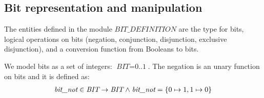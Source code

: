 \documentclass[a4paper]{llncs}
\begin{document}
\subsection{Bit representation and manipulation}
\label{subsec:HardwareLibrary1}

The entities defined in the module $\textit{BIT\_DEFINITION}$ are the
type for bits, logical operations on bits (negation, conjunction,
disjunction, exclusive disjunction), and a conversion function from
Booleans to bits.

We model bits as a set of integers: $\textit{BIT} =
\textit{0..1}$. The negation is an unary function on bits and it is
defined as:
$$
\begin{array}{l}
\textit{bit\_not}  \in  \textit{BIT}  \rightarrow  \textit{BIT}  \mathrel{\wedge} 
\textit{bit\_not} \rm = \rm \{ \rm 0  \mapsto  \rm 1 , \rm 1  \mapsto  \rm 0 \rm \}
\end{array}
$$
\end{document}
